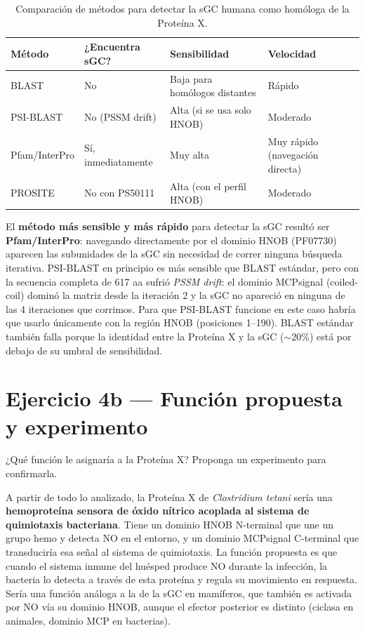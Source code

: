 \begin{table}[H]
\centering
\footnotesize
\begin{tabular}{lP{3cm}P{2.5cm}P{3.5cm}}
\toprule
Método & ¿Encuentra sGC? & Sensibilidad & Velocidad \\
\midrule
BLAST         & No                    & Baja para homólogos distantes & Rápido \\
PSI-BLAST     & No (PSSM drift)       & Alta (si se usa solo HNOB)    & Moderado \\
Pfam/InterPro & Sí, inmediatamente    & Muy alta                      & Muy rápido (navegación directa) \\
PROSITE       & No con PS50111        & Alta (con el perfil HNOB)     & Moderado \\
\bottomrule
\end{tabular}
\caption{Comparación de métodos para detectar la sGC humana como homóloga de la Proteína X.}
\end{table}

El \textbf{método más sensible y más rápido} para detectar la sGC resultó ser \textbf{Pfam/InterPro}:
navegando directamente por el dominio HNOB (PF07730) aparecen las subunidades de la sGC sin
necesidad de correr ninguna búsqueda iterativa. PSI-BLAST en principio es más sensible que BLAST
estándar, pero con la secuencia completa de 617 aa sufrió \textit{PSSM drift}: el dominio
MCPsignal (coiled-coil) dominó la matriz desde la iteración 2 y la sGC no apareció en ninguna de
las 4 iteraciones que corrimos. Para que PSI-BLAST funcione en este caso habría que usarlo
únicamente con la región HNOB (posiciones 1--190). BLAST estándar también falla porque la
identidad entre la Proteína X y la sGC ($\sim$20\%) está por debajo de su umbral de sensibilidad.

\section{Ejercicio 4b --- Función propuesta y experimento}

\begin{consigna}
¿Qué función le asignaría a la Proteína X? Proponga un experimento para confirmarla.
\end{consigna}

A partir de todo lo analizado, la Proteína X de \textit{Clostridium tetani} sería una
\textbf{hemoproteína sensora de óxido nítrico acoplada al sistema de quimiotaxis bacteriana}.
Tiene un dominio HNOB N-terminal que une un grupo hemo y detecta NO en el entorno, y un dominio
MCPsignal C-terminal que transduciría esa señal al sistema de quimiotaxis. La función propuesta es
que cuando el sistema inmune del huésped produce NO durante la infección, la bacteria lo detecta a
través de esta proteína y regula su movimiento en respuesta. Sería una función análoga a la de la
sGC en mamíferos, que también es activada por NO vía su dominio HNOB, aunque el efector posterior
es distinto (ciclasa en animales, dominio MCP en bacterias).

